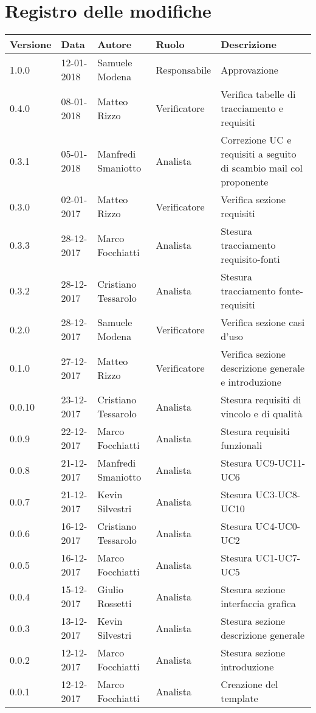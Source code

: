 \documentclass[./AnalisideiRequisiti.tex]{subfiles}
\begin{document}
	
{
	\chapter*{Registro delle modifiche}
\setlength\LTleft{-22mm}
	\begin{longtable}{|p{20mm}|p{20mm}|p{40mm}|p{30mm}|p{50mm}|}
		\hline
		\textbf{Versione} & \textbf{Data} & \textbf{Autore} & \textbf{Ruolo} & \textbf{Descrizione} \\ \hline 
		1.0.0 & 12-01-2018 & Samuele Modena & Responsabile & Approvazione\\ \hline
		0.4.0 & 08-01-2018 & Matteo Rizzo & Verificatore & Verifica tabelle di tracciamento e requisiti\\ \hline
		0.3.1 & 05-01-2018 & Manfredi Smaniotto & Analista & Correzione UC e requisiti a seguito di scambio mail col proponente \\ \hline		
		0.3.0 & 02-01-2017 & Matteo Rizzo & Verificatore & Verifica sezione requisiti\\ \hline
		0.3.3 & 28-12-2017 & Marco Focchiatti & Analista & Stesura tracciamento requisito-fonti\\ \hline	
		0.3.2 & 28-12-2017 & Cristiano Tessarolo & Analista & Stesura tracciamento fonte-requisiti\\ \hline
	   	0.2.0 & 28-12-2017 & Samuele Modena & Verificatore & Verifica sezione casi d’uso\\ \hline
	   	0.1.0 & 27-12-2017 & Matteo Rizzo & Verificatore & Verifica sezione descrizione generale e introduzione  \\ \hline		
		0.0.10 & 23-12-2017 & Cristiano Tessarolo & Analista & Stesura requisiti di vincolo e di qualità\\ \hline		
		0.0.9 & 22-12-2017 & Marco Focchiatti & Analista & Stesura requisiti funzionali \\ \hline		
		0.0.8 & 21-12-2017 & Manfredi Smaniotto & Analista & Stesura UC9-UC11-UC6\\ \hline
		0.0.7 & 21-12-2017 & Kevin Silvestri & Analista & Stesura UC3-UC8-UC10\\ \hline
		0.0.6 & 16-12-2017 & Cristiano Tessarolo & Analista & Stesura UC4-UC0-UC2\\ \hline
		0.0.5 & 16-12-2017 & Marco Focchiatti & Analista & Stesura UC1-UC7-UC5\\ \hline
		0.0.4 & 15-12-2017 & Giulio Rossetti & Analista & Stesura sezione interfaccia grafica\\ \hline
		0.0.3 & 13-12-2017 & Kevin Silvestri & Analista & Stesura sezione descrizione generale\\ \hline
		0.0.2 & 12-12-2017 & Marco Focchiatti & Analista & Stesura sezione introduzione\\ \hline
		0.0.1 & 12-12-2017 & Marco Focchiatti & Analista & Creazione del template\\ \hline
	\end{longtable}

}	
\end{document}
